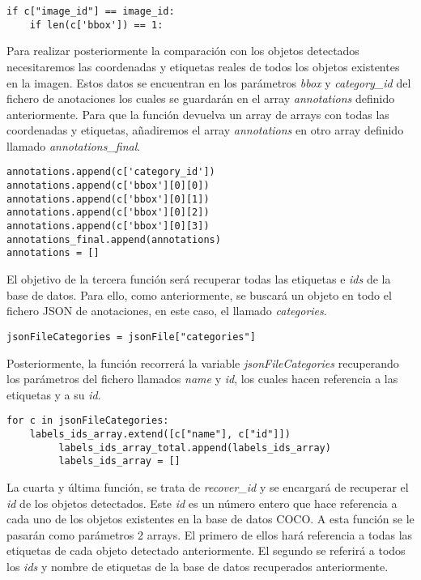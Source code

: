 \documentclass[a4paper, 12pt, oneside]{book}
\begin{document}
\begin{lstlisting}[frame=single]
if c["image_id"] == image_id:
	if len(c['bbox']) == 1:
\end{lstlisting}

Para realizar posteriormente la comparación con los objetos detectados necesitaremos las coordenadas y etiquetas reales de todos los objetos existentes en la imagen. Estos datos se encuentran en los parámetros \textit{bbox} y \textit{category\_id} del fichero de anotaciones los cuales se guardarán en el array \textit{annotations} definido anteriormente. Para que la función devuelva un array de arrays con todas las coordenadas y etiquetas, añadiremos el array \textit{annotations} en otro array definido llamado \textit{annotations\_final}.\\

\begin{lstlisting}[frame=single]
annotations.append(c['category_id'])
annotations.append(c['bbox'][0][0])
annotations.append(c['bbox'][0][1])
annotations.append(c['bbox'][0][2])
annotations.append(c['bbox'][0][3])
annotations_final.append(annotations)
annotations = []
\end{lstlisting}

El objetivo de la tercera función será recuperar todas las etiquetas e \textit{ids} de la base de datos. Para ello, como anteriormente, se buscará un objeto en todo el fichero JSON de anotaciones, en este caso, el llamado \textit{categories}.\\

\begin{lstlisting}[frame=single]
jsonFileCategories = jsonFile["categories"]
\end{lstlisting}

Posteriormente, la función recorrerá la variable \textit{jsonFileCategories} recuperando los parámetros del fichero llamados \textit{name} y \textit{id}, los cuales hacen referencia a las etiquetas y a su \textit{id}.\\

\begin{lstlisting}[frame=single]
for c in jsonFileCategories:
	labels_ids_array.extend([c["name"], c["id"]])
         labels_ids_array_total.append(labels_ids_array)
         labels_ids_array = []
\end{lstlisting}

La cuarta y última función, se trata de \textit{recover\_id} y se encargará de recuperar el \textit{id} de los objetos detectados. Este \textit{id} es un número entero que hace referencia a cada uno de los objetos existentes en la base de datos COCO. A esta función se le pasarán como parámetros 2 arrays. El primero de ellos hará referencia a todas las etiquetas de cada objeto detectado anteriormente. El segundo se referirá a todos los \textit{ids} y nombre de etiquetas de la base de datos recuperados anteriormente.\\
\end{document}
